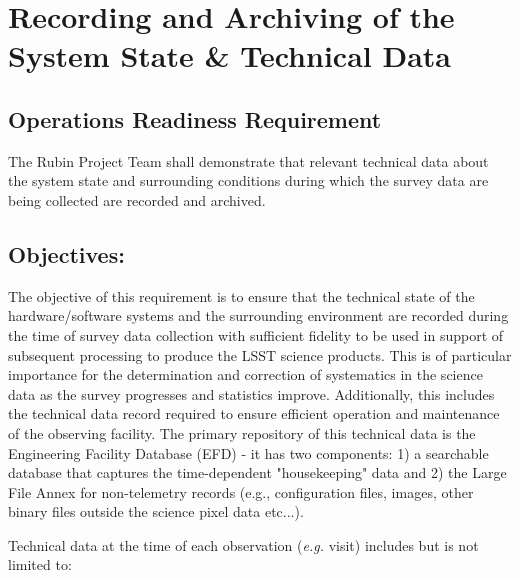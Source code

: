 \section{Recording and Archiving of the System State \& Technical Data}  \label{sec:metadata}

\subsection{Operations Readiness Requirement}

The Rubin Project Team shall demonstrate that relevant technical data about the system state and surrounding conditions during which the survey data are being collected are recorded and archived.

\subsection{Objectives:}

The objective of this requirement is to ensure that the technical state of the hardware/software systems and the surrounding environment are recorded during the time of survey data collection with sufficient fidelity to be used in support of subsequent processing to produce the LSST science products. This is of particular importance for the determination and correction of systematics in the science data as the survey progresses and statistics improve.  Additionally, this includes the technical data record required to ensure efficient operation and maintenance of the observing facility.   The primary repository of this technical data is the Engineering Facility Database (EFD) - it has two components: 
1) a searchable database that captures the time-dependent "housekeeping" data and 
2) the Large File Annex for non-telemetry records (e.g., configuration files, images, other binary files outside the science pixel data etc...).

Technical data at the time of each observation ({\it e.g.} visit) includes but is not limited to:

